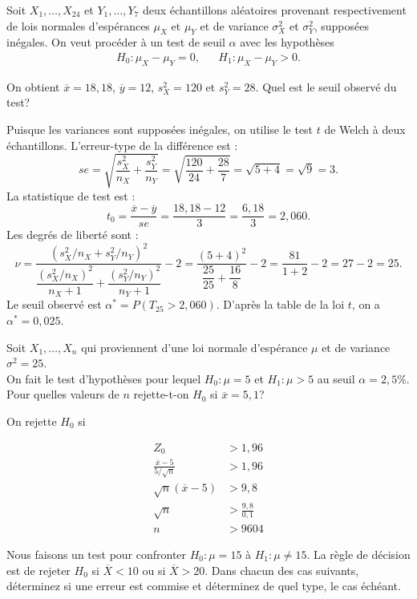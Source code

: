 \begin{questions}
\begin{parts}
\end{parts}

\pageblanche
\question[10] Soit $X_1,\hdots,X_{24}$ et $Y_1,\hdots,Y_{7}$ deux échantillons aléatoires provenant respectivement de lois normales d'espérances $\mu_X$ et $\mu_Y$ et de variance $\sigma^2_X$ et $\sigma^2_Y$, supposées inégales.
On veut procéder à un test de seuil $\alpha$ avec les hypothèses
\begin{align*}
    H_0:\mu_X-\mu_Y=0, & & H_1:\mu_X-\mu_Y>0.
\end{align*}

On obtient $\overline{x}=18,18$, $\overline{y}=12$, $s_X^2=120$ et $s_Y^2=28$. Quel est le seuil observé du test?

\begin{solution}
Puisque les variances sont supposées inégales, on utilise le test $t$ de Welch à deux échantillons. L'erreur-type de la différence est :
$$se=\sqrt{\frac{s_X^2}{n_X}+\frac{s_Y^2}{n_Y}}=\sqrt{\frac{120}{24}+\frac{28}{7}}=\sqrt{5+4}=\sqrt{9}=3.$$
La statistique de test est :
$$t_0=\frac{\overline{x}-\overline{y}}{se}=\frac{18,18-12}{3}=\frac{6,18}{3}=2,060.$$
Les degrés de liberté sont :
$$\nu=\frac{(s_X^2/n_X+s_Y^2/n_Y)^2}{\dfrac{(s_X^2/n_X)^2}{n_X+1}+\dfrac{(s_Y^2/n_Y)^2}{n_Y+1}}-2=\frac{(5+4)^2}{\dfrac{25}{25}+\dfrac{16}{8}}-2=\frac{81}{1+2}-2=27-2=25.$$
Le seuil observé est $\alpha^*=P(T_{25}>2,060)$. D'après la table de la loi $t$, on a $\alpha^*=0,025$.
\end{solution}
\pageblanche

\question[6] Soit $X_1,\hdots, X_{n}$ qui proviennent d'une loi normale d'espérance $\mu$ et de variance $\sigma^2=25$. \\
On fait le test d'hypothèses pour lequel
$H_0:\mu=5$ et $H_1:\mu>5$ au seuil $\alpha=2,5\%$.\\
Pour quelles valeurs de $n$ rejette-t-on $H_0$ si $\overline{x}=5,1$?

\begin{solution}
    On rejette $H_0$ si 

    \begin{align*}
        Z_0&>1,96\\
        \frac{\overline{x}-5}{5/\sqrt{n}}&>1,96\\
        \sqrt{n}(\overline{x}-5)&>9,8\\
        \sqrt{n}&>\frac{9,8}{0,1}\\
        n&>9604
    \end{align*}
\end{solution}
\vspace{5.5in}
\question Nous faisons un test pour confronter $H_0: \mu=15$ à $H_1:\mu\neq15$. La règle de décision est de rejeter $H_0$ si $\overline{X}<10$ ou si $\overline{X}>20$. Dans chacun des cas suivants, déterminez si une erreur est commise et déterminez de quel type, le cas échéant. 


\end{questions}
